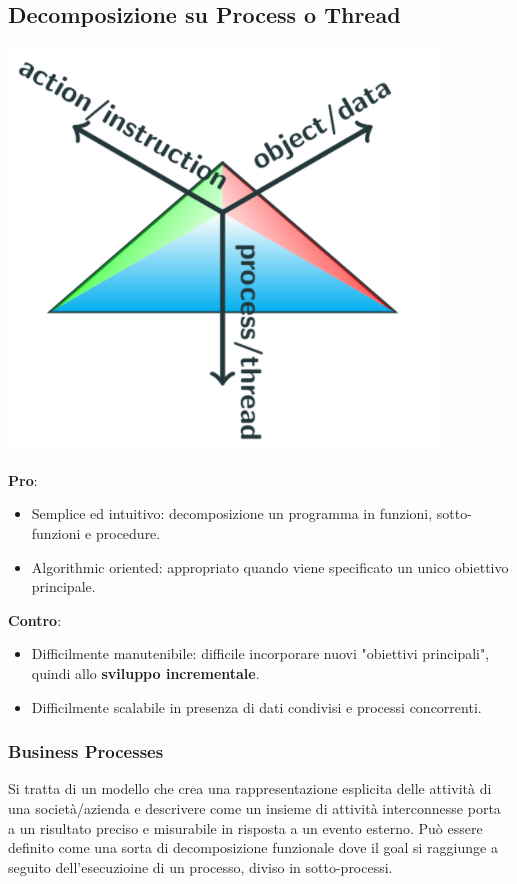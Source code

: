 \subsection{Decomposizione su Process o Thread}
\begin{center}
    \includegraphics[scale=0.4]{images/triangolo di meyer functional.PNG}
\end{center}
\textbf{Pro}:
\begin{itemize}
    \item  Semplice ed intuitivo: decomposizione un programma in funzioni, sotto-funzioni e procedure.
    \item Algorithmic oriented: appropriato quando viene specificato un unico obiettivo principale.
\end{itemize}
\textbf{Contro}:
\begin{itemize}
    \item  Difficilmente manutenibile: difficile incorporare nuovi "obiettivi principali", quindi allo \textbf{sviluppo incrementale}.
    \item Difficilmente scalabile in presenza di dati condivisi e processi concorrenti.
\end{itemize}

\subsubsection{Business Processes}
Si tratta di un modello che crea una rappresentazione esplicita delle attività di una società/azienda e descrivere come un insieme di attività interconnesse porta a un risultato preciso e misurabile in risposta a un evento esterno.
Può essere definito come una sorta di decomposizione funzionale dove il goal si raggiunge a seguito dell'esecuzioine di un processo, diviso in sotto-processi.

